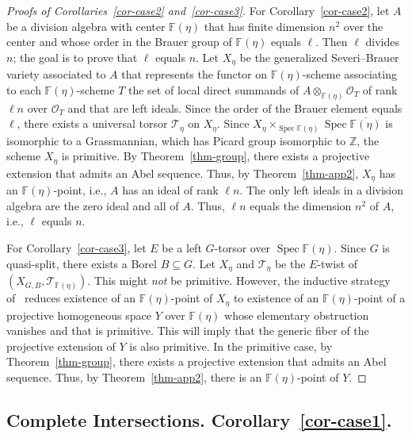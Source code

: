 \documentclass[11pt]{article}
\theoremstyle{definition}
\numberwithin{equation}{section}
\numberwithin{figure}{section}
\numberwithin{table}{section}
\newcommand{\mbb}{\mathbb}
\newcommand{\ZZ}{\mbb{Z}}
\newcommand{\FF}{\mbb{F}}
\newcommand{\mc}{\mathcal}
\newcommand{\mcT}{\mc{T}}
\newcommand{\OO}{\mc{O}}
\newcommand{\ol}{\overline}
\DeclareMathOperator{\SP}{Spec}
\begin{document}
\begin{proof}[Proofs of Corollaries~\ref{cor-case2} and~\ref{cor-case3}]
For Corollary~\ref{cor-case2}, let $A$ be a division algebra with center $\FF(\eta)$ that has finite dimension $n^2$ over the center and whose order in the Brauer group of $\FF(\eta)$ equals $\ell$. Then $\ell$ divides $n$; the goal is to prove that $\ell$ equals $n$. Let $X_\eta$ be the generalized Severi--Brauer variety associated to $A$ that represents the functor on $\FF(\eta)$-scheme associating to each $\FF(\eta)$-scheme $T$ the set of local direct summands of $A\otimes_{\FF(\eta)}\OO_T$ of rank $\ell n$ over $\OO_T$ and that are left ideals. Since the order of the Brauer element equals $\ell$, there exists a universal torsor $\mcT_\eta$ on $X_\eta$. Since $X_\eta \times_{\SP \FF(\eta)} \SP
\ol{\FF(\eta)}$ is isomorphic to a Grassmannian, which has Picard group isomorphic to $\ZZ$, the scheme $X_\eta$ is primitive. By Theorem~\ref{thm-group}, there exists a projective extension that admits an Abel sequence. Thus, by Theorem~\ref{thm-app2}, $X_\eta$ has an $\FF(\eta)$-point, i.e., $A$ has an ideal of rank $\ell n$. The only left ideals in a division algebra are the zero ideal and all of $A$. Thus, $\ell n$ equals the dimension $n^2$ of $A$, i.e., $\ell$ equals $n$.

For Corollary~\ref{cor-case3}, let $E$ be a left $G$-torsor over $\SP \FF(\eta)$. Since $G$ is quasi-split, there exists a Borel $B\subseteq G$. Let $X_\eta$ and $\mcT_\eta$ be the $E$-twist of $(X_{G,B},\mcT_{\FF(\eta)})$. This might
\emph{not} be primitive. However, the inductive strategy of~\cite[Lemma~12.1]{Zhu} reduces existence of an $\FF(\eta)$-point of $X_\eta$ to existence of an $\FF(\eta)$-point of a projective homogeneous space $Y$ over $\FF(\eta)$ whose elementary obstruction vanishes and that is primitive. This will imply that the generic fiber of the projective extension of $Y$ is also primitive. In the primitive case, by Theorem~\ref{thm-group}, there exists a projective extension that admits an Abel sequence. Thus, by Theorem~\ref{thm-app2}, there is an $\FF(\eta)$-point of $Y$.
\end{proof}



\subsection{Complete Intersections. Corollary~\ref{cor-case1}.} \label{subsec-CI}
\end{document}
